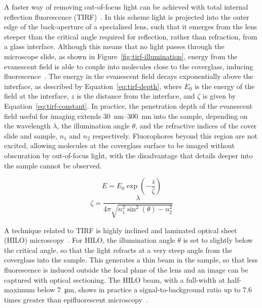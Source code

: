 A faster way of removing out-of-focus light can be achieved with total internal reflection fluorescence (TIRF)~\cite[\textit{ch. 21}]{periasamy2013methods}.
In this scheme light is projected into the outer edge of the back-aperture of a specialised lens, such that it emerges from the lens steeper than the critical angle required for reflection, rather than refraction, from a glass interface.
Although this means that no light passes through the microscope slide, as shown in Figure~\ref{fig:tirf-illumination}, energy from the evanescent field is able to couple into molecules close to the coverglass, inducing fluorescence~\cite{axelrod1981cell}.
The energy in the evanescent field decays exponentially above the interface, as described by Equation~\ref{eq:tirf-depth}, where $E_0$ is the energy of the field at the interface, $z$ is the distance from the interface, and $\zeta$ is given by Equation~\ref{eq:tirf-constant}. 
In practice, the penetration depth of the evanescent field useful for imaging extends \SIrange[range-phrase=--]{30}{300}{\nano\metre} into the sample, depending on the wavelength $\lambda$, the illumination angle $\theta$, and the refractive indices of the cover slide and sample, $n_1$ and $n_2$ respectively.
Fluorophores beyond this region are not excited, allowing molecules at the coverglass surface to be imaged without obscuration by out-of-focus light, with the disadvantage that details deeper into the sample cannot be observed.

\begin{equation} \label{eq:tirf-depth}
E = E_0\exp\left(-\frac{z}{\zeta}\right)
\end{equation}
\begin{equation} \label{eq:tirf-constant}
\zeta = \frac{\lambda}{4\pi\sqrt{n_1^2\sin^2\left(\theta\right)-n_2^2}}
\end{equation}

A technique related to TIRF is highly inclined and laminated optical sheet (HILO) microscopy~\cite{tokunaga2008highly}. 
For HILO, the illumination angle $\theta$ is set to slightly below the critical angle, so that the light refracts at a very steep angle from the coverglass into the sample. 
This generates a thin beam in the sample, so that less fluorescence is induced outside the focal plane of the lens and an image can be captured with optical sectioning.
The HILO beam, with a full-width at half-maximum below \SI{7}{\micro\metre}, shows in practice a signal-to-background ratio up to 7.6 times greater than epifluorescent microscopy~\cite{tokunaga2008highly}.

